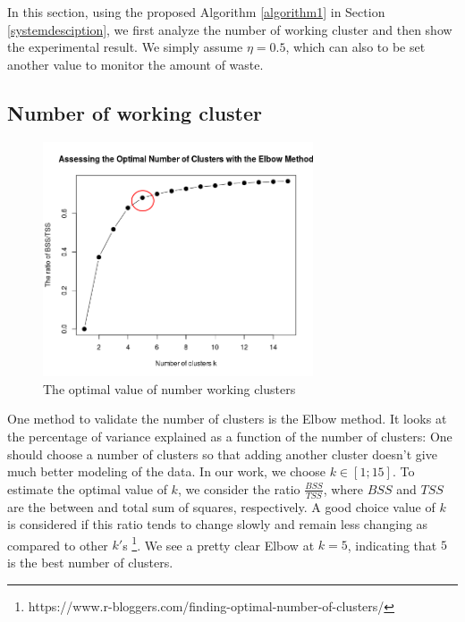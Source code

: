 \documentclass[conference,compsoc]{IEEEtran}
\begin{document}
 
 
 In this section, using the proposed Algorithm \ref{algorithm1} in Section \ref{systemdesciption}, we first analyze the number of working cluster and then show the experimental result. We simply assume $\eta = 0.5$, which can also to be set another value to monitor the amount of waste. 
 
 \subsection{Number of working cluster}
 
 \begin{figure}
 	\centering
 	\includegraphics[width=8cm]{elbow5}
 	\caption{The optimal value of number working clusters}
 	\label{fig3}
 \end{figure}
 
 One method to validate the number of clusters is the Elbow method. It looks at the percentage of variance explained as a function of the number of clusters: One should choose a number of clusters so that adding another cluster doesn’t give much better modeling of the data. In our work, we choose $k \in [1;15]$. To estimate the optimal value of $k$, we consider the ratio $\frac{BSS}{TSS}$, where $BSS$ and $TSS$ are the between and total sum of squares, respectively. A good choice value of $k$ is considered if this ratio tends to change slowly and remain less changing as compared to other $k'$s \footnote{https://www.r-bloggers.com/finding-optimal-number-of-clusters/}. We see a pretty clear Elbow at $k = 5$, indicating that $5$ is the best number of clusters.
 
\end{document}
